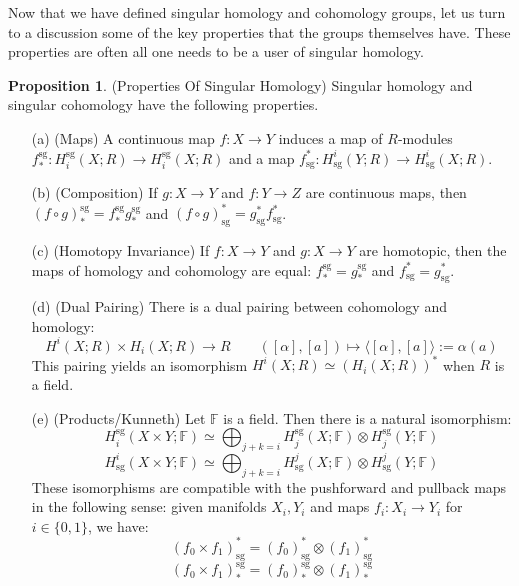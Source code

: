 \documentclass[12pt]{article}
\theoremstyle{definition}
\newtheorem{proposition}[theorem]{Proposition}
\numberwithin{equation}{section}
\newcommand{\op}{\operatorname}
\begin{document}
Now that we have defined singular homology and cohomology groups, let us turn to a discussion some of the key properties that the groups themselves have. These properties are often all one needs to be a user of singular homology. 

\begin{proposition} \label{prop:singular_homology_properties} (Properties Of Singular Homology) Singular homology and singular cohomology have the following properties.
\begin{itemize}
	\item[(a)] (Maps) A continuous map $f:X \to Y$ induces a map of $R$-modules $f^{\op{sg}}_*:H^{\op{sg}}_i(X;R) \to H^{\op{sg}}_i(X;R)$ and a map $f^*_{\op{sg}}:H^i_{\op{sg}}(Y;R) \to H^i_{\op{sg}}(X;R)$.
	\item[(b)] (Composition) If $g:X \to Y$ and $f:Y \to Z$ are continuous maps, then $(f \circ g)^{\op{sg}}_* = f^{\op{sg}}_*g^{\op{sg}}_*$ and $(f \circ g)_{\op{sg}}^* = g_{\op{sg}}^*f_{\op{sg}}^*$.
	\item[(c)] (Homotopy Invariance) If $f:X \to Y$ and $g:X \to Y$ are homotopic, then the maps of homology and cohomology are equal: $f^{\op{sg}}_* = g^{\op{sg}}_*$ and $f_{\op{sg}}^* = g_{\op{sg}}^*$.
	\item[(d)] (Dual Pairing) There is a dual pairing between cohomology and homology:
	\[H^i(X;R) \times H_i(X;R) \to R \qquad ([\alpha], [a]) \mapsto \langle [\alpha],[a]\rangle := \alpha(a)\]
	This pairing yields an isomorphism $H^i(X;R) \simeq (H_i(X;R))^*$ when $R$ is a field.
	\item[(e)] (Products/Kunneth) Let $\mathbb{F}$ is a field. Then there is a natural isomorphism:
	\[
	H^{\op{sg}}_i(X \times Y;\mathbb{F}) \simeq \bigoplus_{j + k = i} H_j^{\op{sg}}(X;\mathbb{F}) \otimes H_j^{\op{sg}}(Y;\mathbb{F})
	\]
	\[
	H_{\op{sg}}^i(X \times Y;\mathbb{F}) \simeq \bigoplus_{j + k = i} H^j_{\op{sg}}(X;\mathbb{F}) \otimes H^j_{\op{sg}}(Y;\mathbb{F})
	\]
	These isomorphisms are compatible with the pushforward and pullback maps in the following sense: given manifolds $X_i,Y_i$ and maps $f_i:X_i \to Y_i$ for $i \in \{0,1\}$, we have:
	\[
	(f_0 \times f_1)_{\op{sg}}^* = (f_0)_{\op{sg}}^* \otimes (f_1)_{\op{sg}}^*
	\]
	\[
	(f_0 \times f_1)^{\op{sg}}_* = (f_0)^{\op{sg}}_* \otimes (f_1)^{\op{sg}}_*
	\]
	\end{itemize}
\end{proposition}
\end{document}
